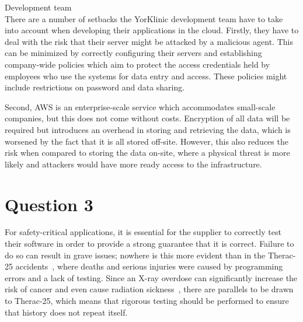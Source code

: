 \documentclass[12pt]{article}
\begin{document}
\item Development team \\
There are a number of setbacks the YorKlinic development team have to take into account when developing their applications in the cloud. Firstly, they have to deal with the risk that their server might be attacked by a malicious agent. This can be minimized by correctly configuring their servers and establishing company-wide policies which aim to protect the access credentials held by employees who use the systems for data entry and access. These policies might include restrictions on password and data sharing.

Second, AWS is an enterprise-scale service which accommodates small-scale companies, but this does not come without costs. Encryption of all data will be required but introduces an overhead in storing and retrieving the data, which is worsened by the fact that it is all stored off-site. However, this also reduces the risk when compared to storing the data on-site, where a physical threat is more likely and attackers would have more ready access to the infrastructure.

\section*{Question 3}

For safety-critical applications, it is essential for the supplier to correctly test their software in order to provide a strong guarantee that it is correct. Failure to do so can result in grave issues; nowhere is this more evident than in the Therac-25 accidents~\cite{therac}, where deaths and serious injuries were caused by programming errors and a lack of testing. Since an X-ray overdose can significantly increase the risk of cancer and even cause radiation sickness~\cite{rad}, there are parallels to be drawn to Therac-25, which means that rigorous testing should be performed to ensure that history does not repeat itself.
\end{document}
